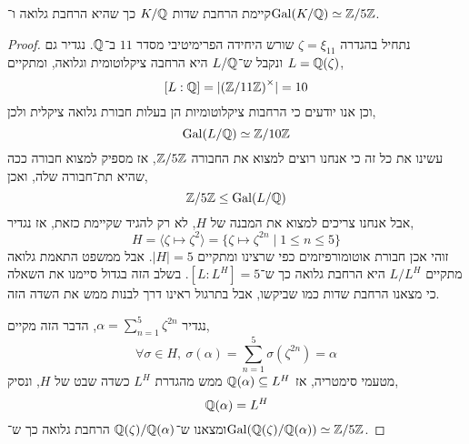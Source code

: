 



\begin{proposition}
	קיימת הרחבת שדות $K / \mathbb{Q}$ כך שהיא הרחבת גלואה ו־$\operatorname{Gal}(K / \mathbb{Q}) \simeq \mathbb{Z} / 5\mathbb{Z}$.
\end{proposition}
\begin{proof}
	נתחיל בהגדרה $\zeta = \xi_{11}$ שורש היחידה הפרימיטיבי מסדר $11$ ב־$\mathbb{Q}$.
	נגדיר גם $L = \mathbb{Q}(\zeta)$ ונקבל ש־$L / \mathbb{Q}$ היא הרחבה ציקלוטומית וגלואה, ומתקיים,
	\[
		[L : \mathbb{Q}]
		= | {(\mathbb{Z} / 11\mathbb{Z})}^\times |
		= 10
	\]
	וכן אנו יודעים כי הרחבות ציקלוטומיות הן בעלות חבורת גלואה ציקלית ולכן,
	\[
		\operatorname{Gal}(L / \mathbb{Q})
		\simeq \mathbb{Z} / 10\mathbb{Z}
	\]
	עשינו את כל זה כי אנחנו רוצים למצוא את החבורה $\mathbb{Z} / 5\mathbb{Z}$, אז מספיק למצוא חבורה ככה שהיא תת־חבורה שלה, ואכן,
	\[
		\mathbb{Z} / 5\mathbb{Z}
		\le \operatorname{Gal}(L / \mathbb{Q})
	\]
	אבל אנחנו צריכים למצוא את המבנה של $H$, לא רק להגיד שקיימת כזאת, אז נגדיר,
	\[
		H
		= \langle \zeta \mapsto \zeta^2 \rangle
		= \{ \zeta \mapsto \zeta^{2 n} \mid 1 \le n \le 5 \}
	\]
	זוהי אכן חבורת אוטומורפיזמים כפי שרצינו ומתקיים $|H| = 5$.
	אבל ממשפט התאמת גלואה מתקיים $L / L^H$ היא הרחבת גלואה כך ש־$[L : L^H] = 5$.
	בשלב הזה בגדול סיימנו את השאלה כי מצאנו הרחבת שדות כמו שביקשו, אבל בתרגול ראינו דרך לבנות ממש את השדה הזה.

	נגדיר $\alpha = \sum_{n = 1}^5 \zeta^{2 n}$, הדבר הזה מקיים,
	\[
		\forall \sigma \in H,\ 
		\sigma(\alpha)
		= \sum_{n = 1}^5 \sigma(\zeta^{2 n})
		= \alpha
	\]
	מטעמי סימטריה, אז $\mathbb{Q}(\alpha) \subseteq L^H$ ממש מהגדרת $L^H$ כשדה שבט של $H$, ונסיק,
	\[
		\mathbb{Q}(\alpha) = L^H
	\]
	ומצאנו ש־$\mathbb{Q}(\zeta) / \mathbb{Q}(\alpha)$ הרחבת גלואה כך ש־$\operatorname{Gal}(\mathbb{Q}(\zeta) / \mathbb{Q}(\alpha)) \simeq \mathbb{Z} / 5\mathbb{Z}$.
\end{proof}


